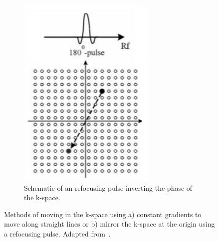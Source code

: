 \begin{figure}[h]
\begin{subfigure}{0.445\textwidth}
    		\includegraphics[width=\textwidth]{refocusing_k-sapce_pulse.png}
    		\caption{Schematic of an refocusing pulse inverting the phase of the k-space.}
    		\label{fig:refocusing_k-sapce_pulse}
	\end{subfigure}
	\caption{Methods of moving in the k-space using a) constant gradients to move along straight lines or b) mirror the k-space at the origin using a refocusing pulse. Adapted from~\cite{SamplingStrategies}.}
	\label{fig:kSpaceTrajectories}
\end{figure}

